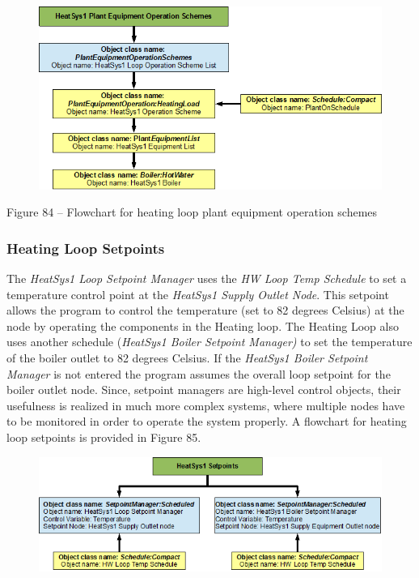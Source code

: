 \begin{figure}[htbp]
\centering
\includegraphics{media/image084.png}
\caption{}
\end{figure}

Figure 84 -- Flowchart for heating loop plant equipment operation schemes

\subsubsection{Heating Loop Setpoints}\label{heating-loop-setpoints}

The \emph{HeatSys1 Loop Setpoint Manager} uses the \emph{HW Loop Temp Schedule} to set a temperature control point at the \emph{HeatSys1 Supply Outlet Node}. This setpoint allows the program to control the temperature (set to 82 degrees Celsius) at the node by operating the components in the Heating loop. The Heating Loop also uses another schedule (\emph{HeatSys1 Boiler Setpoint Manager)} to set the temperature of the boiler outlet to 82 degrees Celsius. If the \emph{HeatSys1 Boiler Setpoint Manager} is not entered the program assumes the overall loop setpoint for the boiler outlet node. Since, setpoint managers are high-level control objects, their usefulness is realized in much more complex systems, where multiple nodes have to be monitored in order to operate the system properly. A flowchart for heating loop setpoints is provided in Figure 85.

\begin{figure}[htbp]
\centering
\includegraphics{media/image085.png}
\caption{}
\end{figure}

